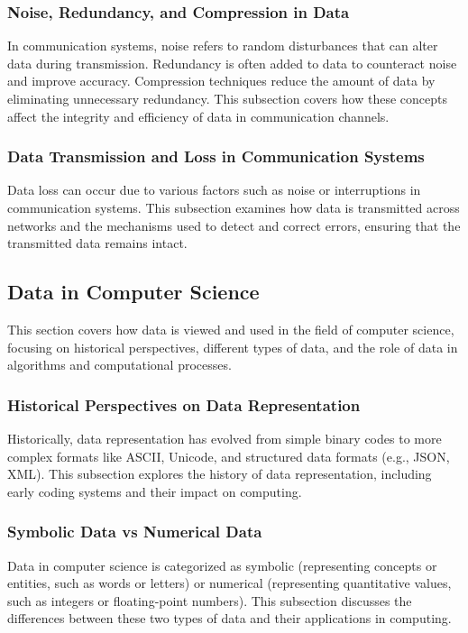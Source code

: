 \documentclass[12pt, oneside]{book}
\begin{document}
\subsubsection{Noise, Redundancy, and Compression in Data}
In communication systems, noise refers to random disturbances that can alter data during transmission. Redundancy is often added to data to counteract noise and improve accuracy. Compression techniques reduce the amount of data by eliminating unnecessary redundancy. This subsection covers how these concepts affect the integrity and efficiency of data in communication channels.

\subsubsection{Data Transmission and Loss in Communication Systems}
Data loss can occur due to various factors such as noise or interruptions in communication systems. This subsection examines how data is transmitted across networks and the mechanisms used to detect and correct errors, ensuring that the transmitted data remains intact.

\subsection{Data in Computer Science}
This section covers how data is viewed and used in the field of computer science, focusing on historical perspectives, different types of data, and the role of data in algorithms and computational processes.

\subsubsection{Historical Perspectives on Data Representation}
Historically, data representation has evolved from simple binary codes to more complex formats like ASCII, Unicode, and structured data formats (e.g., JSON, XML). This subsection explores the history of data representation, including early coding systems and their impact on computing.

\subsubsection{Symbolic Data vs Numerical Data}
Data in computer science is categorized as symbolic (representing concepts or entities, such as words or letters) or numerical (representing quantitative values, such as integers or floating-point numbers). This subsection discusses the differences between these two types of data and their applications in computing.
\end{document}
